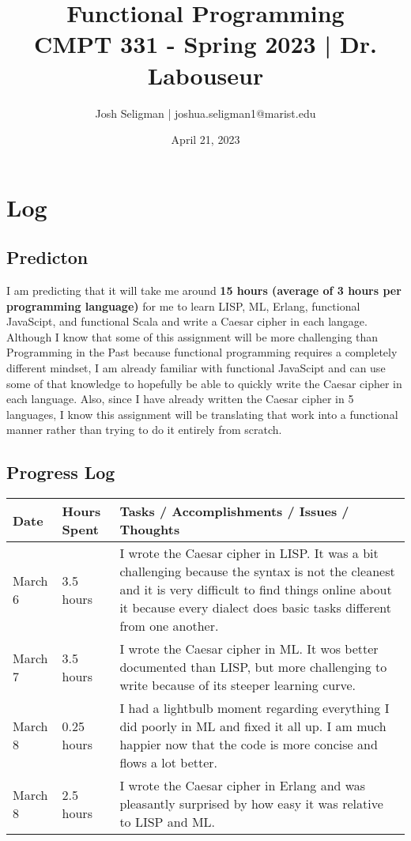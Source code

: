 \documentclass[letterpaper, 10pt, DIV=13]{scrartcl}
\title {
	\normalfont
	\huge{Functional Programming} \\
	\vspace{10pt}
	\large{CMPT 331 - Spring 2023 | Dr. Labouseur}
}
\author{\normalfont Josh Seligman | joshua.seligman1@marist.edu}
\date{\normalfont April 21, 2023}
\numberwithin{equation}{section}
\numberwithin{figure}{section}
\numberwithin{table}{section}
\begin{document}
\maketitle

\section{Log}
\subsection{Predicton}
I am predicting that it will take me around \textbf{15 hours (average of 3 hours per programming language)} for me to learn LISP, ML, Erlang, 
functional JavaScipt, and functional Scala and write a Caesar cipher in each langage. Although I know that some of this assignment will be more 
challenging than Programming in the Past because functional programming requires a completely different mindset, I am already familiar with 
functional JavaScipt and can use some of that knowledge to hopefully be able to quickly write the Caesar cipher in each language. Also, since I 
have already written the Caesar cipher in 5 languages, I know this assignment will be translating that work into a functional manner rather than 
trying to do it entirely from scratch. 

\subsection{Progress Log}
\begin{center}
	\begin{longtable}{|p{1in}|p{1in}|p{4in}|}
		\hline
		Date & Hours Spent & Tasks / Accomplishments / Issues / Thoughts
		\\
		\hline
        March 6 & 3.5 hours & I wrote the Caesar cipher in LISP. It was a bit challenging because the syntax is not the cleanest and it is very 
        difficult to find things online about it because every dialect does basic tasks different from one another.
        \\
		\hline
        March 7 & 3.5 hours & I wrote the Caesar cipher in ML. It wos better documented than LISP, but more challenging to write because of its 
        steeper learning curve.
        \\
        \hline
        March 8 & 0.25 hours & I had a lightbulb moment regarding everything I did poorly in ML and fixed it all up. I am much happier now that the code is
        more concise and flows a lot better.
        \\
        \hline
        March 8 & 2.5 hours & I wrote the Caesar cipher in Erlang and was pleasantly surprised by how easy it was relative to LISP and ML.
        \\
        \hline
	\end{longtable}
\end{center}
\end{document}
